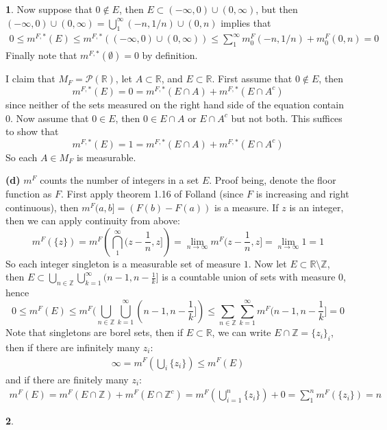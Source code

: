 \documentclass[10.5pt]{article}
\theoremstyle{definition}
\newtheorem{pb}{}
\newcommand{\set}[1]{\{#1\}}
\newcommand{\tor}{\text{ or }}
\begin{document}
\begin{pb}
        Now suppose that \(0 \not \in E\), then \(E \subset (- \infty, 0) \cup (0,\infty)\), but then \((- \infty, 0) \cup (0,\infty) = \bigcup_1^\infty (-n, 1/n) \cup (0,n)\)
        implies that
        \begin{align*}
            0 \leq m^{F,*}(E) \leq m^{F,*}((- \infty, 0) \cup (0,\infty)) 
            \leq \sum_1^\infty m^F_0(-n, 1/n) + m^F_0(0,n) = 0
        \end{align*}
        Finally note that \(m^{F,*}(\emptyset) = 0\) by definition.

        I claim that \(M_F = \mathcal{P}(\mathbb{R})\), let \(A \subset \mathbb{R}\), and \(E \subset \mathbb{R}\). First assume that \(0 \not \in E\), then
        \[m^{F,*}(E) = 0 = m^{F,*}(E \cap A) + m^{F,*}(E \cap A^c)\]
        since neither of the sets measured on the right hand side of the equation contain 0. Now assume that \(0 \in E\), then \(0 \in E \cap A \tor E \cap A^c\) but not both.
        This suffices to show that
        \[m^{F,*}(E) = 1 = m^{F,*}(E \cap A) + m^{F,*}(E \cap A^c)\]
        So each \(A \in M_F\) is measurable.

        \textbf{(d)} \(m^F\) counts the number of integers in a set \(E\). Proof being, denote the floor function as \(F\).
        First apply theorem 1.16 of Folland (since \(F\) is increasing and right continuous), then \(m^F(a,b] = (F(b) - F(a))\) is a measure.
        If \(z\) is an integer, then we can apply continuity from above:
        \[m^F(\set{z}) = m^F \left(\bigcap_1^\infty (z-\frac1n,z]\right) = \lim_{n\to\infty}m^F(z-\frac1n,z] = \lim_{n\to\infty}1 = 1\]
        So each integer singleton is a measurable set of measure \(1\). Now let \(E \subset \mathbb{R}\setminus\mathbb{Z}\), then \newline
        \(E \subset \bigcup_{n \in \mathbb{Z}}\bigcup_{k=1}^\infty(n-1,n-\frac{1}{k}]\) is a countable union of sets with measure \(0\), hence
        \[0 \leq m^F(E) \leq m^F (\bigcup_{n \in \mathbb{Z}}\bigcup_{k=1}^\infty(n-1,n-\frac{1}{k}]) \leq \sum_{n\in \mathbb{Z}}\sum_{k=1}^\infty m^F(n-1,n-\frac{1}{k}] = 0\]
        Note that singletons are borel sets, then if \(E \subset \mathbb{R}\), we can write \(E \cap \mathbb{Z} = \set{z_i}_i\), then if there are infinitely many \(z_i\):
        \begin{align*}
            \infty = m^F\left(\bigcup_i\set{z_i}\right) \leq m^F(E)
        \end{align*}
        and if there are finitely many \(z_i\):
        \begin{align*}
            m^F(E) = m^F\left(E \cap \mathbb{Z}\right) + m^F\left(E \cap \mathbb{Z}^c\right) = m^F\left(\bigcup_{i=1}^n \set{z_i}\right) + 0 = \sum_1^n m^F(\set{z_i}) = n
        \end{align*}
    \end{pb}
    \begin{pb}
        
    \end{pb}
\end{document}
